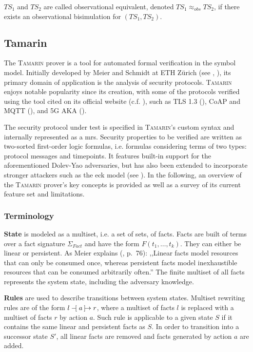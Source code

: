 \noindent
$TS_1$ and $TS_2$ are called observational equivalent, denoted $TS_1 \approx_{obs} TS_2$, if there exists an observational bisimulation for $(TS_1, TS_2)$.

\subsection{Tamarin}
\label{ssec:tamarin}

The \textsc{Tamarin} prover is a tool for automated formal verification in the symbol model.
Initially developed by Meier and Schmidt at ETH Zürich (see \cite{schmidt2012formal}, \cite{meier2013advancing}), its primary domain of application is the analysis of security protocols.
\textsc{Tamarin} enjoys notable popularity since its creation, with some of the protocols verified using the tool cited on its official website (c.f. \cite{tamarin}), such as TLS 1.3 (\cite{cremers2017comprehensive}), CoAP and MQTT (\cite{kim2017automated}), and 5G AKA (\cite{basin2018formal}).

The security protocol under test is specified in \textsc{Tamarin}'s custom syntax and internally represented as a \gls{mrs}.
Security properties to be verified are written as two-sorted first-order logic formulas, i.e. formulas considering terms of two types: protocol messages and timepoints.
It features built-in support for the aforementioned Dolev-Yao adversaries, but has also been extended to incorporate stronger attackers such as the \gls{eck} model (see \cite{lamacchia2007stronger}).
In the following, an overview of the \textsc{Tamarin} prover's key concepts is provided as well as a survey of its current feature set and limitations.

\subsubsection{Terminology}

\textbf{State} is modeled as a multiset, i.e. a set of sets, of facts.
Facts are built of terms over a fact signature $\Sigma_{Fact}$ and have the form $F(t_1, \ldots, t_k)$.
They can either be linear or persistent.
As Meier explains (\cite{meier2013advancing}, p.~76): ,,Linear facts model resources that can only be consumed once, whereas persistent facts model inexhaustible resources that can be consumed arbitrarily often.''
The finite multiset of all facts represents the system state, including the adversary knowledge.

\textbf{Rules} are used to describe transitions between system states.
Multiset rewriting rules are of the form $l \tracerule{a} r$, where a multiset of facts $l$ is replaced with a multiset of facts $r$ by action $a$.
Such rule is applicable to a given state $S$ if it contains the same linear and persistent facts as $S$.
In order to transition into a successor state $S'$, all linear facts are removed and facts generated by action $a$ are added.

